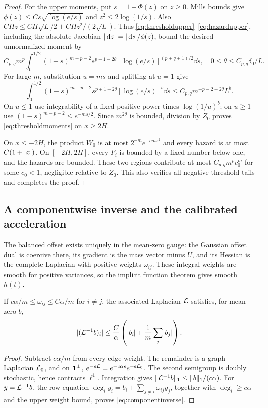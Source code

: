 \begin{proof}
For the upper moments, put $s=1-\Phi(z)$ on $z\ge0$.
Mills bounds give
$\phi(z)\le Cs\sqrt{\log(e/s)}$ and $z^2\le2\log(1/s)$.
Also
$CHz\le CH\sqrt L/2+CHz^2/(2\sqrt L)$.
Thus \eqref{eq:thresholdupper}--\eqref{eq:hazardupper}, including the
absolute Jacobian $\lvert \,\mathrm d z\rvert=\lvert \,\mathrm d s\rvert/\phi(z)$, bound the desired unnormalized moment by
\begin{equation}\label{eq:beta-integral}
 C_{p,q}m^p\int_0^{1/2}(1-s)^{m-p-2}
       s^{p+1-2\theta}[\log(e/s)]^{(p+q+1)/2}\dd s,
 \quad 0\le\theta\le C_{p,q}\delta_0/L.
\end{equation}
For large $m$, substitution $u=ms$ and splitting at $u=1$ give
\[
 \int_0^{1/2}(1-s)^{m-p-2}s^{p+1-2\theta}
       [\log(e/s)]^b\dd s
 \le C_{p,q}m^{-p-2+2\theta}L^b.
\]
On $u\le1$ use integrability of a fixed positive power times
$\log(1/u)^b$; on $u\ge1$ use $(1-s)^{m-p-2}\le e^{-ms/2}$.
Since $m^{2\theta}$ is bounded, division by $Z_0$ proves
\eqref{eq:thresholdmoments} on $x\ge2H$.

On $x\le-2H$, the product $W_0$ is at most
$2^{-m}e^{-cmx^2}$ and every hazard is at most $C(1+\lvert x\rvert)$.
On $[-2H,2H]$, every $F_i$ is bounded by a fixed number below one,
and the hazards are bounded. These two regions contribute at most
$C_{p,q}m^pc_0^m$ for some $c_0<1$, negligible relative to $Z_0$.
This also verifies all negative-threshold tails and completes the proof.
\end{proof}

\subsection{A componentwise inverse and the calibrated acceleration}
The balanced offset exists uniquely in the mean-zero gauge: the Gaussian
offset dual is coercive there, its gradient is the mass vector minus $U$,
and its Hessian is the complete Laplacian with positive weights
$\omega_{ij}$. These integral weights are smooth for positive variances,
so the implicit function theorem gives smooth $h(t)$.

\begin{lemma}\label{lem:componentinverse}
If $c\alpha/m\le\omega_{ij}\le C\alpha/m$ for $i\ne j$, the
associated Laplacian $\mathcal L$ satisfies, for mean-zero $b$,
\begin{equation}\label{eq:componentinverse}
 \lvert (\mathcal L^{-1}b)_i\rvert
      \le\frac C\alpha\left(\lvert b_i\rvert+\frac1m\sum_j\lvert b_j\rvert\right).
\end{equation}
\end{lemma}
\begin{proof}
Subtract $c\alpha/m$ from every edge weight. The remainder is a graph
Laplacian $\mathcal L_0$, and on $\mathbf 1^\perp$,
$e^{-s\mathcal L}=e^{-c\alpha s}e^{-s\mathcal L_0}$.
The second semigroup is doubly stochastic, hence contracts $\ell^1$.
Integration gives $\lVert \mathcal L^{-1}b\rVert_1\le\lVert b\rVert_1/(c\alpha)$.
For $y=\mathcal L^{-1}b$, the row equation
$\deg_i y_i=b_i+\sum_{j\ne i}\omega_{ij}y_j$, together with
$\deg_i\ge c\alpha$ and the upper weight bound, proves
\eqref{eq:componentinverse}.
\end{proof}

